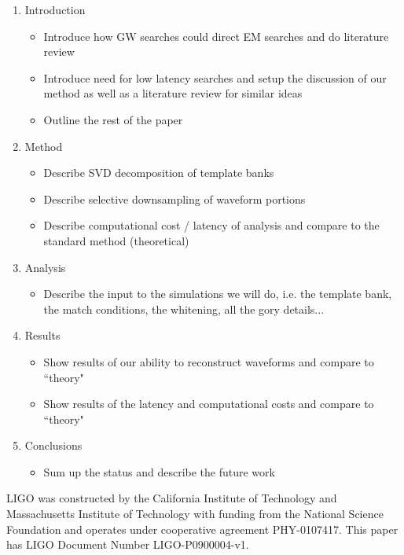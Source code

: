 \documentclass[aps,prd,showpacs,groupedaddress,showkeys,preprintnumbers]{revtex4}
\begin{document}
\begin{enumerate}
\item{Introduction}
\begin{itemize}
\item{Introduce how GW searches could direct EM searches and do literature review}
\item{Introduce need for low latency searches and setup the discussion of our
method as well as a literature review for similar ideas}
\item{Outline the rest of the paper}
\end{itemize}
\item{Method}
\begin{itemize}
\item{Describe SVD decomposition of template banks}
\item{Describe selective downsampling of waveform portions}
\item{Describe computational cost / latency of analysis and compare to the 
standard method (theoretical)}
\end{itemize}
\item{Analysis}
\begin{itemize}
\item{Describe the input to the simulations we will do, i.e. the template bank,
the match conditions, the whitening, all the gory details...}
\end{itemize}
\item{Results}
\begin{itemize}
\item{Show results of our ability to reconstruct waveforms and compare to 
``theory"}
\item{Show results of the latency and computational costs and compare to ``theory"}
\end{itemize}
\item{Conclusions}
\begin{itemize}
\item{Sum up the status and describe the future work}
\end{itemize}
\end{enumerate}
\begin{acknowledgments}
LIGO was constructed by the California Institute of Technology and Massachusetts Institute of Technology with funding from the National Science Foundation and operates under cooperative agreement PHY-0107417. This paper has LIGO Document Number LIGO-P0900004-v1.
\end{acknowledgments}
\end{document}
